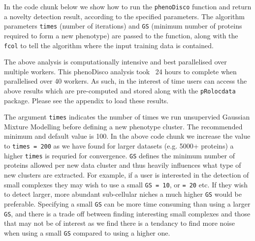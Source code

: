 In the code chunk below we show how to run the \texttt{phenoDisco}
function and return a novelty detection result, according to the
specified parameters. The algorithm parameters \texttt{times} (number
of iterations) and \texttt{GS} (minimum number of proteins required to
form a new phenotype) are passed to the function, along with the
\texttt{fcol} to tell the algorithm where the input training data is
contained.

\begin{knitrout}
\color{fgcolor}\begin{kframe}
\begin{alltt}
 \hlkwb{<-}   \hlstd{=} \hlstd{,}  \hlstd{=} \hlstd{,}  \hlstd{=} \hlstd{)}
\end{alltt}
\end{kframe}
\end{knitrout}

The above analysis is computationally intensive and best parallelised over
multiple workers. This phenoDisco analysis took ~24 hours to complete
when parallelised over 40 workers. As such, in the interest of time
users can access the above results which are
pre-computed and stored along with the \texttt{pRolocdata} package.
Please see the appendix to load these results.

The argument \texttt{times} indicates the number of times we run
unsupervied Gaussian Mixture Modelling before defining a new phenotype
cluster.  The recommended minimum and default value is 100. In the
above code chunk we increase the value to \texttt{times = 200} as we
have found for larger datasets (e.g. 5000+ proteins) a higher
\texttt{times} is requried for convergence. \texttt{GS} defines the
minimum number of proteins allowed per new data cluster and thus
heavily influences what type of new clusters are extracted. For
example, if a user is interested in the detection of small complexes
they may wish to use a small \texttt{GS = 10}, or \texttt{= 20} etc.
If they wish to detect larger, more abundant sub-cellular niches a
much higher \texttt{GS} would be preferable. Specifying a small
\texttt{GS} can be more time consuming than using a larger
\texttt{GS}, and there is a trade off between finding interesting
small complexes and those that may not be of interest as we find there
is a tendancy to find more noise when using a small \texttt{GS}
compared to using a higher one.

